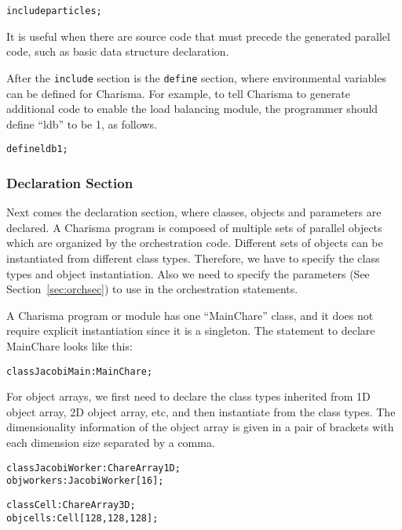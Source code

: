\documentclass[10pt]{article}
\begin{document}
\begin{alltt}
    include particles;
\end{alltt}

It is useful when there are source code that must precede the generated
parallel code, such as basic data structure declaration. 

After the {\tt include} section is the {\tt define} section, where environmental
variables can be defined for Charisma. For example, to tell Charisma to generate
additional code to enable the load balancing module, the programmer should
define ``ldb'' to be 1, as follows.

\begin{alltt}
    define ldb 1;
\end{alltt}

\subsubsection{Declaration Section}

Next comes the declaration section, where classes, objects and parameters are
declared. A Charisma program is composed of multiple sets of parallel objects
which are organized by the orchestration code. Different sets of objects can be
instantiated from different class types. Therefore, we have to specify the class
types and object instantiation. Also we need to specify the parameters (See
Section~\ref{sec:orchsec}) to use in the orchestration statements. 

A Charisma program or module has one ``MainChare'' class, and it does not
require explicit instantiation since it is a singleton. The statement to declare
MainChare looks like this:

\begin{alltt}
    class JacobiMain : MainChare;
\end{alltt}

For object arrays, we first need to declare the class types inherited from 1D
object array, 2D object array, etc, and then instantiate from the class types. 
The dimensionality information of the object array is given in a pair of 
brackets with each dimension size separated by a comma.

\begin{alltt}
    class JacobiWorker : ChareArray1D;
    obj workers : JacobiWorker[16];

    class Cell : ChareArray3D;
    obj cells : Cell[128,128,128];
\end{alltt}
\end{document}

